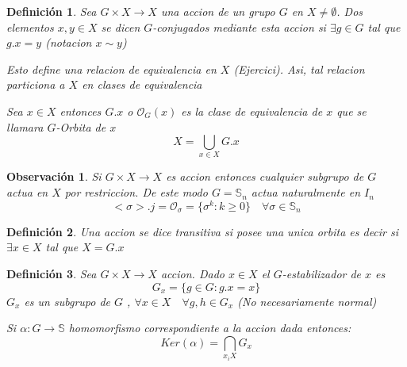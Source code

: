 \documentclass[10pt]{extarticle}
\theoremstyle{break}
\newtheorem*{remark}{Observación}
\newtheorem{definition}{Definición}[section]
\theoremstyle{definition}
\begin{document}
\begin{definition}
	Sea $G\times X \longrightarrow X$ una accion de un grupo $G$ en $X\neq\emptyset$. Dos elementos $x,y\in X $ se dicen $G$-conjugados mediante esta accion si $\exists g\in G $ tal que $g.x=y$ (notacion $x\sim y$)

	Esto define una relacion de equivalencia en $X$ (Ejercici). Asi, tal relacion particiona a $X$ en clases de equivalencia

	Sea $x\in X $ entonces $G.x$ o $\mathcal{O}_{G}(x)$ es la clase de equivalencia de $x$ que se llamara $G$-Orbita de $x$ $$X=\bigcup_{x\in X }G.x $$
\end{definition}

\begin{remark}
	Si $G\times X \longrightarrow X$ es accion entonces cualquier subgrupo de $G$ actua en $X$ por restriccion. De este modo $G=\mathbb{S}_{n}$ actua naturalmente en $I_{n}$ 
	$$<\sigma>.j=\mathcal{O}_{\sigma}=\{\sigma^{k}:k\geq 0\}\quad \forall\sigma \in\mathbb{S}_{n} $$ 
\end{remark}

\begin{definition}
	Una accion se dice transitiva si posee una unica orbita es decir si $\exists x\in X $ tal que $X=G.x$
\end{definition}

\begin{definition}
	Sea $G\times X\longrightarrow X$ accion. Dado $x\in X$ el $G$-estabilizador de $x$ es $$G_{x}=\{g\in G: g.x=x\}$$
	$G_{x}$ es un subgrupo de $G$ , $\forall x\in X\quad\forall g,h\in G_{x}$ (No necesariamente normal)

	Si $\alpha :G\longrightarrow \mathbb{S}$ homomorfismo correspondiente a la accion dada entonces: $$Ker(\alpha)=\bigcap_{x_{i} X}G_{x}$$
\end{definition}
\end{document}
